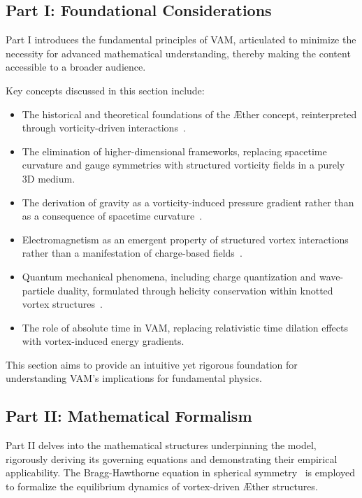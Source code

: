 \subsection*{Part I: Foundational Considerations}
Part I introduces the fundamental principles of VAM, articulated to minimize the necessity for advanced mathematical understanding, thereby making the content accessible to a broader audience.

Key concepts discussed in this section include:
\begin{itemize}
    \item The historical and theoretical foundations of the Æther concept, reinterpreted through vorticity-driven interactions~\cite{young1801,maxwell1865,michelson1887}.
    \item The elimination of higher-dimensional frameworks, replacing spacetime curvature and gauge symmetries with structured vorticity fields in a purely 3D medium.
    \item The derivation of gravity as a vorticity-induced pressure gradient rather than as a consequence of spacetime curvature~\cite{einstein_1905_4}.
    \item Electromagnetism as an emergent property of structured vortex interactions rather than a manifestation of charge-based fields~\cite{Kaluza1921,Klein1926}.
    \item Quantum mechanical phenomena, including charge quantization and wave-particle duality, formulated through helicity conservation within knotted vortex structures~\cite{kleckner2016}.
    \item The role of absolute time in VAM, replacing relativistic time dilation effects with vortex-induced energy gradients.
\end{itemize}
This section aims to provide an intuitive yet rigorous foundation for understanding VAM's implications for fundamental physics.

\subsection*{Part II: Mathematical Formalism}
Part II delves into the mathematical structures underpinning the model, rigorously deriving its governing equations and demonstrating their empirical applicability. The Bragg-Hawthorne equation in spherical symmetry~\cite{keller2024} is employed to formalize the equilibrium dynamics of vortex-driven Æther structures.

